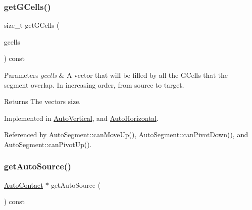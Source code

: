 \subsubsection{\texorpdfstring{get\+G\+Cells()}{getGCells()}}
{\footnotesize\ttfamily size\+\_\+t get\+G\+Cells (\begin{DoxyParamCaption}\item[{vector$<$ \mbox{\hyperlink{classKatabatic_1_1GCell}{G\+Cell}} $\ast$$>$ \&}]{gcells }\end{DoxyParamCaption}) const\hspace{0.3cm}{\ttfamily [pure virtual]}}


\begin{DoxyParams}{Parameters}
{\em gcells} & A vector that will be filled by all the G\+Cells that the segment overlap. In increasing order, from source to target. \\
\hline
\end{DoxyParams}
\begin{DoxyReturn}{Returns}
The vector\textquotesingle{}s size. 
\end{DoxyReturn}


Implemented in \mbox{\hyperlink{classKatabatic_1_1AutoVertical_accdaef4410043f64da247a94a309733e}{Auto\+Vertical}}, and \mbox{\hyperlink{classKatabatic_1_1AutoHorizontal_accdaef4410043f64da247a94a309733e}{Auto\+Horizontal}}.



Referenced by Auto\+Segment\+::can\+Move\+Up(), Auto\+Segment\+::can\+Pivot\+Down(), and Auto\+Segment\+::can\+Pivot\+Up().

\mbox{\label{classKatabatic_1_1AutoSegment_a2ca3fac97e325ec8a55d3e03a2ce11a6}} 
\subsubsection{\texorpdfstring{get\+Auto\+Source()}{getAutoSource()}}
{\footnotesize\ttfamily \mbox{\hyperlink{classKatabatic_1_1AutoContact}{Auto\+Contact}} $\ast$ get\+Auto\+Source (\begin{DoxyParamCaption}{ }\end{DoxyParamCaption}) const\hspace{0.3cm}{\ttfamily [inline]}}

